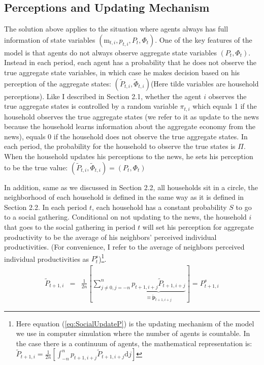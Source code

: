 \documentclass[12pt,letterpaper]{article}
\begin{document}
\subsection{Perceptions and Updating Mechanism}
The solution above applies to the situation where agents always has full information of state variables $(\pmb{\mathrm{m}}_{t,i},p_{t,i},P_{t},\Phi_{t})$. One of the key features of the model is that agents do not always observe aggregate state variables $(P_{t},\Phi_{t})$. Instead in each period, each agent has a probability that he does not observe the true aggregate state variables, in which case he makes decision based on his perception of the aggregate states: $(\tilde{P}_{t,i},\tilde{\Phi}_{t,i})$(Here tilde variables are household perceptions). Like I described in Section 2.1, whether the agent $i$ observes the true aggregate states is controlled by a random variable $\pi_{t,i}$ which equals 1 if the household observes the true aggregate states (we refer to it as update to the news because the household learns information about the aggregate economy from the news), equals 0 if the household does not observe the true aggregate states. In each period, the probability for the household to observe the true states is $\Pi$. When the household updates his perceptions to the news, he sets his perception to be the true value: $(\tilde{P}_{t,i},\tilde{\Phi}_{t,i})=(P_{t},\Phi_{t})$
\par
In addition, same as we discussed in Section 2.2, all households sit in a circle, the neighborhood of each household is defined in the same way as it is defined in Section 2.2. In each period $t$, each household has a constant probability $S$ to go to a social gathering. Conditional on not updating to the news, the household $i$ that goes to the social gathering in period $t$ will set his perception for aggregate productivity to be the average of his neighbors' perceived individual productivities. (For convenience, I refer to the average of neighbors perceived individual productivities as $P^{s}_{t}$)\footnote{Here equation (\ref{eq:SocialUpdateP}) is the updating mechanism of the model we use in computer simulation where the number of agents is countable. In the case there is a continuum of agents, the mathematical representation is: $\tilde{P}_{t+1,i} = \frac{1}{2n}\left[\int_{-n}^{n}p_{t+1,i+j}\tilde{P}_{t+1,i+j}\text{d}j\right]$}.
\begin{eqnarray} \label{eq:SocialUpdateP}
\tilde{P}_{t+1,i} & = & \frac{1}{2n}\left[\sum_{j\neq0,j=-n}^{n}\underbrace{p_{t+1,i+j}\tilde{P}_{t+1,i+j}}_{\equiv \tilde{\pmb{p}}_{t+1,i+j}}\right]=P^{s}_{t+1,i}
\end{eqnarray}
\end{document}
